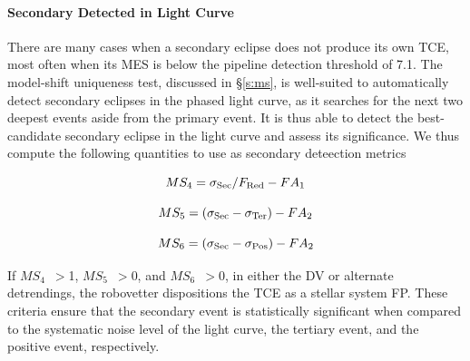 \paragraph{Secondary Detected in Light Curve}
\label{secdetectsec}

There are many cases when a secondary eclipse does not produce its own TCE, most often when its MES is below the \kepler{} pipeline detection threshold of 7.1. The model-shift uniqueness test, discussed in \S\ref{s:ms}, is well-suited to automatically detect secondary eclipses in the phased light curve, as it searches for the next two deepest events aside from the primary event. It is thus able to detect the best-candidate secondary eclipse in the light curve and assess its significance. We thus compute the following quantities to use as secondary deteection metrics

\begin{equation}
    MS_{4} = \sigma_{\rm Sec}/F_{\rm Red} - FA_{1}
\end{equation}

\begin{equation}
    MS_{5} = (\sigma_{\rm Sec} - \sigma_{\rm Ter}) - FA_{2}
\end{equation}

\begin{equation}
    MS_{6} = (\sigma_{\rm Sec} - \sigma_{\rm Pos}) - FA_{2}
\end{equation}

If $MS_{4}$~$>$1, $MS_{5}$~$>$0, and $MS_{6}$~$>$0, in either the DV or alternate detrendings, the robovetter dispositions the TCE as a stellar system FP. These criteria ensure that the secondary event is statistically significant when compared to the systematic noise level of the light curve, the tertiary event, and the positive event, respectively.

